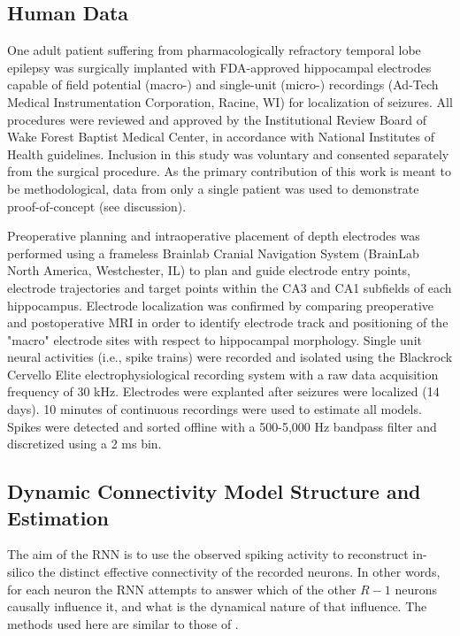 \documentclass[11pt,a4paper,final]{article}
\begin{document}
\subsection{Human Data}

One adult patient suffering from pharmacologically refractory temporal lobe epilepsy was surgically implanted with FDA-approved hippocampal electrodes capable of field potential (macro-) and single-unit (micro-) recordings (Ad-Tech Medical Instrumentation Corporation, Racine, WI) for localization of seizures. 
All procedures were reviewed and approved by the Institutional Review Board of Wake Forest Baptist Medical Center, in accordance with National Institutes of Health guidelines.
Inclusion in this study was voluntary and consented separately from the surgical procedure. 
As the primary contribution of this work is meant to be methodological, data from only a single patient was used to demonstrate proof-of-concept (see discussion). 

Preoperative planning and intraoperative placement of depth electrodes was performed using a frameless Brainlab Cranial Navigation System (BrainLab North America, Westchester, IL) to plan and guide electrode entry points, electrode trajectories and target points within the CA3 and CA1 subfields of each hippocampus.
Electrode localization was confirmed by comparing preoperative and postoperative MRI in order to identify electrode track and positioning of the "macro" electrode sites with respect to hippocampal morphology.
Single unit neural activities (i.e., spike trains) were recorded and isolated using the Blackrock Cervello Elite electrophysiological recording system with a raw data acquisition frequency of 30 kHz.
Electrodes were explanted after seizures were localized (14 days).
10 minutes of continuous recordings were used to estimate all models.
Spikes were detected and sorted offline with a 500-5,000 Hz bandpass filter and discretized using a 2 ms bin.

\subsection{Dynamic Connectivity Model Structure and Estimation}

The aim of the RNN is to use the observed spiking activity to reconstruct in-silico the distinct effective connectivity of the \nn{} recorded neurons.
In other words, for each neuron the RNN attempts to answer which of the other $R-1$ neurons causally influence it, and what is the dynamical nature of that influence. The methods used here are similar to those of \citet{song16sparse}.
\end{document}
